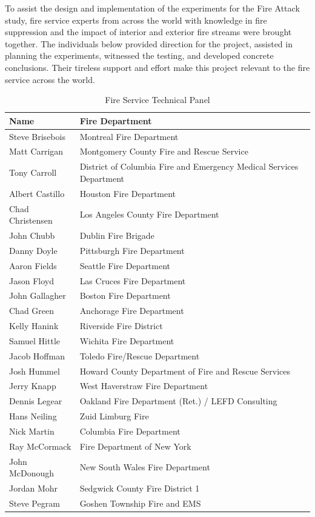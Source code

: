 \documentclass[12pt,oneside]{book}
\begin{document}
\clearpage

To assist the design and implementation of the experiments for the Fire Attack study, fire service experts from across the world with knowledge in fire suppression and the impact of interior and exterior fire streams were brought together. The individuals below provided direction for the project, assisted in planning the experiments, witnessed the testing, and developed concrete conclusions. Their tireless support and effort make this project relevant to the fire service across the world. 


\begin{table}[!ht]
	\centering
	\caption*{Fire Service Technical Panel}
	\begin{tabular}{ll}
		\toprule[1.5pt]
		Name & Fire Department \\ 
		\midrule
		Steve Brisebois  & Montreal Fire Department \\ 
		Matt Carrigan    & Montgomery County Fire and Rescue Service \\ 
		Tony Carroll     & District of Columbia Fire and Emergency Medical Services Department \\ 
		Albert Castillo  & Houston Fire Department \\ 
		Chad Christensen & Los Angeles County Fire Department \\ 
		John Chubb       & Dublin Fire Brigade \\ 		 		  
		Danny Doyle      & Pittsburgh Fire Department \\ 
		Aaron Fields     & Seattle Fire Department \\ 
		Jason Floyd      & Las Cruces Fire Department \\ 
		John Gallagher   & Boston Fire Department \\ 
		Chad Green       & Anchorage Fire Department \\ 
		Kelly Hanink     & Riverside Fire District \\ 
		Samuel Hittle    & Wichita Fire Department \\ 
		Jacob Hoffman    & Toledo Fire/Rescue Department \\ 
		Josh Hummel      & Howard County Department of Fire and Rescue Services \\ 
		Jerry Knapp      & West Haverstraw Fire Department \\ 
		Dennis Legear    & Oakland Fire Department (Ret.) / LEFD Consulting\\ 
		Hans Neiling     & Zuid Limburg Fire \\ 
		Nick Martin      & Columbia Fire Department \\ 
		Ray McCormack    & Fire Department of New York \\ 
		John McDonough   & New South Wales Fire Department \\ 
		Jordan Mohr      & Sedgwick County Fire District 1 \\ 
		Steve Pegram     & Goshen Township Fire and EMS \\ 
		\bottomrule[1.25pt]
	\end{tabular}
\end{table}
\end{document}
